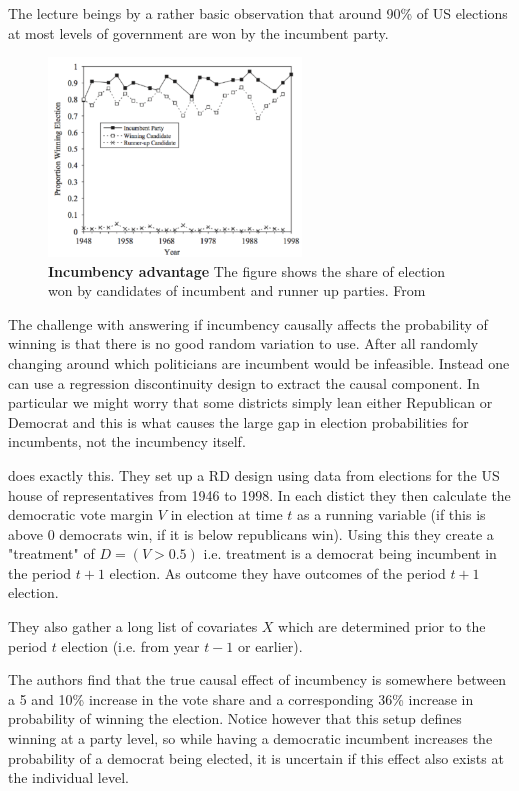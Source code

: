 The lecture beings by a rather basic observation that around 90\% of US elections at most levels of government are won by the incumbent party.

\begin{figure}
    \raggedleft
    \includegraphics[width=0.6\textwidth]{figures/lee2008.png}
    \caption{\textbf{Incumbency advantage} The figure shows the share of election won by candidates of incumbent and runner up parties. From \cite{lee_randomized_2008}}
    \label{fig: incumbency}
\end{figure}

The challenge with answering if incumbency causally affects the probability of winning is that there is no good random variation to use. After all randomly changing around which politicians are incumbent would be infeasible. Instead one can use a regression discontinuity design to extract the causal component. In particular we might worry that some districts simply lean either Republican or Democrat and this is what causes the large gap in election probabilities for incumbents, not the incumbency itself.

\citeauthor{lee_randomized_2008} does exactly this. They set up a RD design using data from elections for the US house of representatives from 1946 to 1998. In each distict they then calculate the democratic vote margin $V$ in election at time $t$ as a running variable (if this is above 0 democrats win, if it is below republicans win). Using this they create a "treatment" of $D=(V>0.5)$ i.e. treatment is a democrat being incumbent in the period $t+1$ election. As outcome they have outcomes of the period $t+1$ election.

They also gather a long list of covariates $X$ which are determined prior to the period $t$ election (i.e. from year $t-1$ or earlier).

The authors find that the true causal effect of incumbency is somewhere between a 5 and 10\% increase in the vote share and a corresponding 36\% increase in probability of winning the election. Notice however that this setup defines winning at a party level, so while having a democratic incumbent increases the probability of a democrat being elected, it is uncertain if this effect also exists at the individual level. 

